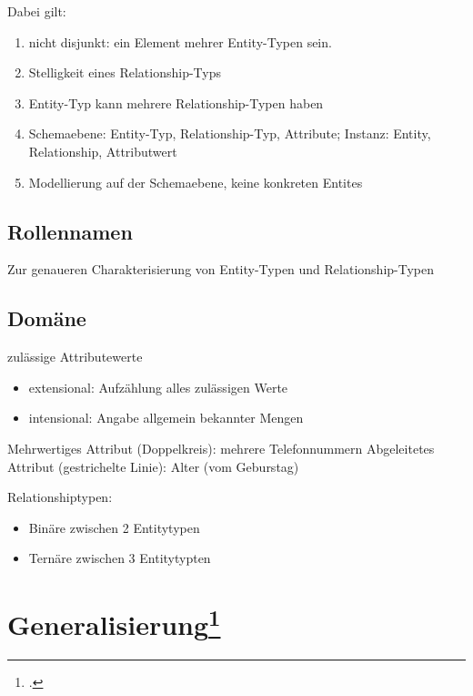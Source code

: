 \documentclass{lehramt-informatik-haupt}
\begin{document}
Dabei gilt:

\begin{enumerate}
\def\labelenumi{\arabic{enumi}.}
\item nicht disjunkt: ein Element mehrer Entity-Typen sein.
\item Stelligkeit eines Relationship-Typs
\item Entity-Typ kann mehrere Relationship-Typen haben
\item Schemaebene: Entity-Typ, Relationship-Typ, Attribute; Instanz: Entity,
Relationship, Attributwert
\item Modellierung auf der Schemaebene, keine konkreten Entites
\end{enumerate}

\subsection{Rollennamen}

Zur genaueren Charakterisierung von Entity-Typen und Relationship-Typen

\subsection{Domäne}

zulässige Attributewerte

\begin{itemize}
\item extensional: Aufzählung alles zulässigen Werte
\item intensional: Angabe allgemein bekannter Mengen
\end{itemize}

Mehrwertiges Attribut (Doppelkreis): mehrere Telefonnummern
Abgeleitetes Attribut (gestrichelte Linie): Alter (vom Geburstag)

Relationshiptypen:

\begin{itemize}
\item Binäre zwischen 2 Entitytypen
\item Ternäre zwischen 3 Entitytypten
\end{itemize}

%

\section{Generalisierung\footcite[Seite 27]{db:fs:1}}
\end{document}
